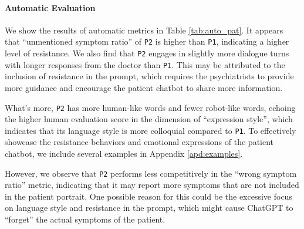 \paragraph{Automatic Evaluation}
We show the results of automatic metrics in Table \ref{tab:auto_pat}. It appears that ``unmentioned symptom ratio'' of \texttt{P2} is higher than \texttt{P1}, indicating a higher level of resistance. We also find that \texttt{P2} engages in slightly more dialogue turns with longer responses from the doctor than \texttt{P1}. This may be attributed to the inclusion of resistance in the prompt, which requires the psychiatrists to provide more guidance and encourage the patient chatbot to share more information. 

What's more, \texttt{P2} has more human-like words and fewer robot-like words, echoing the higher human evaluation score in the dimension of ``expression style'', which indicates that its language style is more colloquial compared to \texttt{P1}. To effectively showcase the resistance behaviors and emotional expressions of the patient chatbot, we include several examples in Appendix \ref{apd:examples}.

However, we observe that \texttt{P2} performs less competitively in the ``wrong symptom ratio'' metric, indicating that it may report more symptoms that are not included in the patient portrait. One possible reason for this could be the excessive focus on language style and resistance in the prompt, which might cause ChatGPT to ``forget'' the actual symptoms of the patient. 



